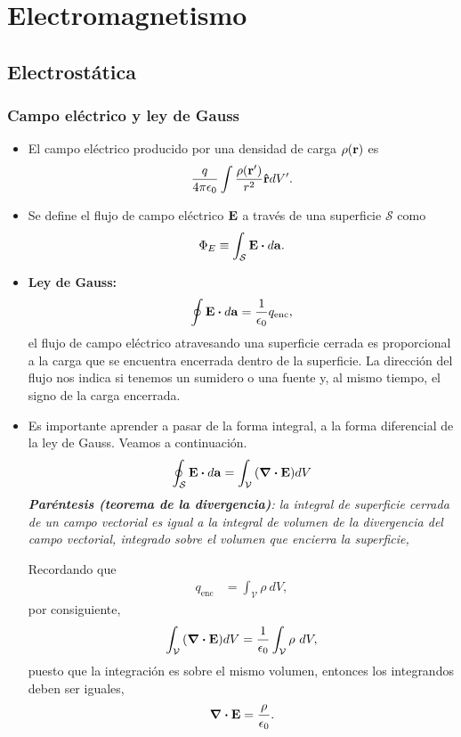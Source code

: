 \chapter{Electromagnetismo}
\section{Electrostática}
\subsection{Campo eléctrico y ley de Gauss}
\begin{itemize}
\item El campo eléctrico producido por una densidad de carga $\rho(\vb{r})$
es
\begin{align}
\frac{q}{4\pi \epsilon_0}\int \frac{\rho(\vb{r}')}{r^2}\boldsymbol{\hat{\mathrm{r}}}dV'.
\end{align}

\item Se define el flujo de campo eléctrico $\vb{E}$ a través de 
una superficie $\mathcal{S}$ como
\begin{align}
\Phi_E\equiv\int _{\mathcal{S}}\vb{E}\vdot d\vb{a}.
\end{align}

\item \textbf{Ley de Gauss:}
\begin{align}
\oint \vb{E}\vdot d\vb{a}=\frac{1}{\ep}q_{\text{enc}},
\end{align}
el flujo de campo eléctrico atravesando una superficie cerrada
es proporcional a la carga que se encuentra encerrada dentro 
de la superficie. La dirección del flujo nos indica si tenemos un 
sumidero o una fuente y, al mismo tiempo, el signo de la carga
encerrada.

\item Es importante aprender a pasar de la forma integral, a la forma
diferencial de la ley de Gauss. Veamos a continuación. 
\begin{align*}
\oint_{\mathcal{S}} \vb{E}\vdot d\vb{a}=\int_{\mathcal{V}}
\qty(\div{\vb{E}})dV
\end{align*}
\textit{\textbf{Paréntesis (teorema de la divergencia)}: la integral 
de superficie cerrada de un campo vectorial es igual a la integral 
de volumen de la divergencia del campo vectorial, integrado sobre
el volumen que encierra la superficie,}

Recordando que 
\begin{align*}
q_{\text{enc}}&=\int_{\mathcal{V}}\rho \ dV,
\end{align*}
por consiguiente, 
\begin{align*}
\int_{\mathcal{V}}\qty(\div{\vb{E}})dV=
\frac{1}{\epsilon_0}\int_{\mathcal{V}}\rho \ dV,
\end{align*}
puesto que la integración es sobre el mismo volumen, entonces
los integrandos deben ser iguales,
\begin{align}
\div{\vb{E}}=\frac{\rho}{\epsilon_0}.
\end{align}


\end{itemize}
